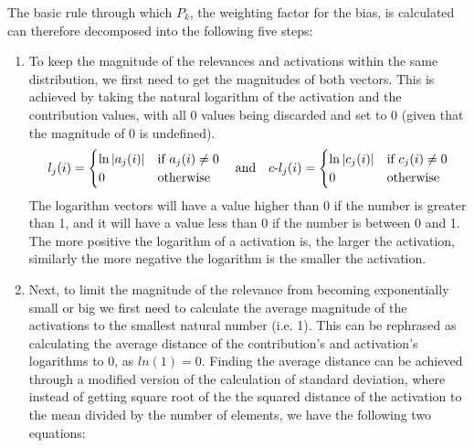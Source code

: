 The basic rule through which $P_k$, the weighting factor for the bias, is calculated can therefore decomposed into the following five steps:
\begin{enumerate}
\item
To keep the magnitude of the relevances and activations within the same distribution, we first need to get the magnitudes of both vectors. This is achieved by taking the natural logarithm of the activation and the contribution values, with all 0 values being discarded and set to 0 (given that the magnitude of 0 is undefined). 
\begin{equation}
\label{eq:log}
    l_{j} (i) = \begin{cases}
    \ln |a_j(i)| & \mbox{if $a_j(i)\not=0$}\\
    0 & \mbox{otherwise}
    \end{cases}
    \quad\mbox{and}\quad 
    \text{$c$-}l_{j}(i) =  \begin{cases}
    \ln |c_j(i)| & \mbox{if $c_j(i)\not=0$}\\
    0 & \mbox{otherwise}
    \end{cases} 
\end{equation}
\newline
The logarithm vectors will have a value higher than 0 if the number is greater than 1, and it will have a value less than 0 if the number is between 0 and 1. The more positive the logarithm of a activation is, the larger the activation, similarly the more negative the logarithm is the smaller the activation.
\item
Next, to limit the magnitude of the relevance from becoming exponentially small or big we first need to calculate the average magnitude of the activations to the smallest natural number (i.e. 1). This can be rephrased as calculating the average distance of the contribution's and activation's logarithms to 0, as $ln(1) = 0$. Finding the average distance can be achieved through a modified version of the calculation of standard deviation, where instead of getting square root of the the squared distance of the activation to the mean divided by the number of elements, we have the following two equations:
\begin{equation}

\end{equation}
\end{enumerate}
